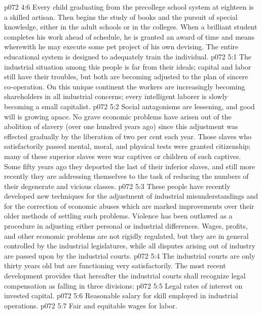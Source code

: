 \vs p072 4:6 Every child graduating from the precollege school system at eighteen is a skilled artisan. Then begins the study of books and the pursuit of special knowledge, either in the adult schools or in the colleges. When a brilliant student completes his work ahead of schedule, he is granted an award of time and means wherewith he may execute some pet project of his own devising. The entire educational system is designed to adequately train the individual.
\vs p072 5:1 The industrial situation among this people is far from their ideals; capital and labor still have their troubles, but both are becoming adjusted to the plan of sincere co\hyp{}operation. On this unique continent the workers are increasingly becoming shareholders in all industrial concerns; every intelligent laborer is slowly becoming a small capitalist.
\vs p072 5:2 Social antagonisms are lessening, and good will is growing apace. No grave economic problems have arisen out of the abolition of slavery (over one hundred years ago) since this adjustment was effected gradually by the liberation of two per cent each year. Those slaves who satisfactorily passed mental, moral, and physical tests were granted citizenship; many of these superior slaves were war captives or children of such captives. Some fifty years ago they deported the last of their inferior slaves, and still more recently they are addressing themselves to the task of reducing the numbers of their degenerate and vicious classes.\plusone
\pc \vs p072 5:3 These people have recently developed new techniques for the adjustment of industrial misunderstandings and for the correction of economic abuses which are marked improvements over their older methods of settling such problems. Violence has been outlawed as a procedure in adjusting either personal or industrial differences. Wages, profits, and other economic problems are not rigidly regulated, but they are in general controlled by the industrial legislatures, while all disputes arising out of industry are passed upon by the industrial courts.
\vs p072 5:4 The industrial courts are only thirty years old but are functioning very satisfactorily. The most recent development provides that hereafter the industrial courts shall recognize legal compensation as falling in three divisions:
\pc \vs p072 5:5 \bibnobreakspace Legal rates of interest on invested capital.
\vs p072 5:6 \bibnobreakspace Reasonable salary for skill employed in industrial operations.
\vs p072 5:7 \bibnobreakspace Fair and equitable wages for labor.
